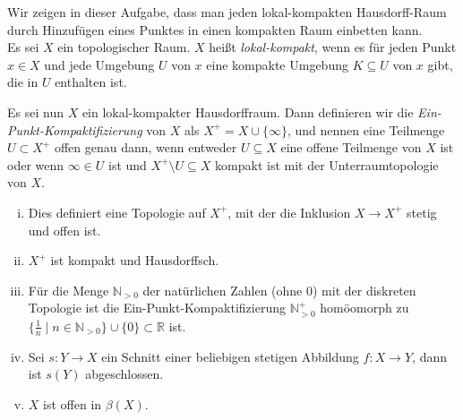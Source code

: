 \begin{aufgabe}
Wir zeigen in dieser Aufgabe, dass man jeden lokal-kompakten Hausdorff-Raum durch Hinzufügen eines Punktes in einen kompakten Raum einbetten kann.\\
Es sei $X$ ein topologischer Raum. $X$ heißt {\itshape lokal-kompakt}, wenn es für jeden Punkt $x\in X$ und jede Umgebung $U$ von $x$ eine kompakte Umgebung $K\subseteq U$ von $x$ gibt, die in $U$ enthalten ist.

Es sei nun $X$ ein lokal-kompakter Hausdorffraum. Dann definieren wir die {\itshape Ein-Punkt-Kompaktifizierung} von $X$ als $X^+= X\cup\{\infty\}$, und nennen eine Teilmenge $U\subset X^+$ offen genau dann, wenn entweder $U\subseteq X$ eine offene Teilmenge von $X$ ist oder wenn $\infty\in U$ ist und $X^+\setminus U\subseteq X$ kompakt ist mit der Unterraumtopologie von $X$.
\begin{enumerate}[i)]
	\item Dies definiert eine Topologie auf $X^+$, mit der die Inklusion $X\to X^+$ stetig und offen ist.
	\item $X^+$ ist kompakt und Hausdorffsch.
	\item Für die Menge $\mathbb N_{>0}$ der natürlichen Zahlen (ohne 0) mit der diskreten Topologie ist die Ein-Punkt-Kompaktifizierung $\mathbb N_{>0}^+$ homöomorph zu $\{\frac{1}{n}\mid n\in \mathbb N_{>0} \} \cup \{0\} \subset \mathbb R$ ist.
	\item Sei $s\colon Y\to X$ ein Schnitt einer beliebigen stetigen Abbildung $f\colon X\to Y$, dann ist $s(Y)$ abgeschlossen. 
	\item $X$ ist offen in $\beta(X)$.
\end{enumerate}
\end{aufgabe}
